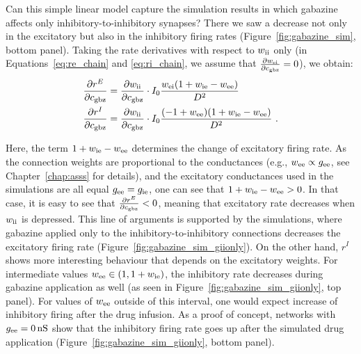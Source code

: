     Can this simple linear model capture the simulation results in which
    gabazine affects only inhibitory-to-inhibitory synapses? There we saw a
    decrease not only in the excitatory but also in the inhibitory firing rates
    (Figure~\ref{fig:gabazine_sim}, bottom panel). Taking the rate derivatives
    with respect to $w_{\rm ii}$ only (in Equations~\ref{eq:re_chain} and
    \ref{eq:ri_chain}, we assume that $\frac{\partial w_{\rm ei}}{\partial
    c_{\rm gbz}} = 0$), we obtain:
    \begin{equation}
      \begin{split}
        \frac{\partial r^E}{\partial c_{\rm gbz}} &=
            \frac{\partial w_{\rm ii}}{\partial c_{\rm gbz}} \cdot
            I_0 \frac{w_{\rm ei}(1 + w_{\rm ie} - w_{\rm ee})} {D^2} \\
        \frac{\partial r^I}{\partial c_{\rm gbz}} &=
            \frac{\partial w_{\rm ii}}{\partial c_{\rm gbz}} \cdot
            I_0 \frac{(-1+w_{\rm ee}) (1 + w_{\rm ie} - w_{\rm ee})} {D^2} \,\, . \\
      \end{split}
    \end{equation}
 
    Here, the term $1+w_{\rm ie}-w_{\rm ee}$ determines the change of
    excitatory firing rate. As the connection weights are proportional to the
    conductances (e.g., $w_{\rm ee} \propto g_{\rm ee}$, see
    Chapter~\ref{chap:asss} for details), and the excitatory conductances
    used in the simulations are all equal $g_{\rm ee}=g_{\rm ie}$, one can see
    that $1+w_{\rm ie}-w_{\rm ee}>0$. In that case, it is easy to see that
    $\frac{\partial r^E}{\partial c_{\rm gbz}} < 0$, meaning that excitatory
    rate decreases when $w_{\rm ii}$ is depressed. This line of arguments is
    supported by the simulations, where gabazine applied only to the
    inhibitory-to-inhibitory connections decreases the excitatory firing rate
    (Figure~\ref{fig:gabazine_sim_giionly}). On the other hand, $r^I$ shows
    more interesting behaviour that depends on the excitatory weights. For
    intermediate values $w_{\rm ee} \in (1, 1+w_{\rm ie})$, the inhibitory rate
    decreases during gabazine application as well (as seen in
    Figure~\ref{fig:gabazine_sim_giionly}, top panel). For values of $w_{\rm
    ee}$ outside of this interval, one would expect increase of inhibitory
    firing after the drug infusion. As a proof of concept, networks with
    $g_{\rm ee}= 0\, \rm nS$ show that the inhibitory firing rate goes up after
    the simulated drug application (Figure~\ref{fig:gabazine_sim_giionly},
    bottom panel).%

